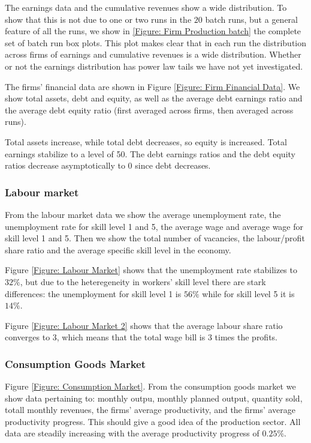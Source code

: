 \documentclass{article}
\begin{document}
The earnings data and the cumulative revenues show a wide distribution. To show that this is not due to one or two runs in the $20$ batch runs, but a general feature of all the runs, we  show in \ref{Figure: Firm Production batch} the complete set of batch run box plots. This plot makes clear that in each run the distribution across firms of earnings and cumulative revenues is a wide distribution.
Whether or not the earnings distribution has power law tails we have not yet investigated.

The firms' financial data are shown in Figure \ref{Figure: Firm Financial Data}. We show total assets, debt and equity, as well as
the average debt earnings ratio and the average debt equity ratio (first averaged across firms, then averaged across runs).

Total assets increase, while total debt decreases, so equity is increased. Total earnings stabilize to a level of 50.
The debt earnings ratios and the debt equity ratios decrease asymptotically to 0 since debt decreases.

\subsubsection*{Labour market}
From the labour market data we show the average unemployment rate, the unemployment rate for skill level 1 and 5, the average wage and 
average wage for skill level 1 and 5. Then we show the total number of vacancies, the labour/profit share ratio and the average specific skill level in the economy.

Figure \ref{Figure: Labour Market} shows that the unemployment rate stabilizes to $32\%$, but due to the heteregeneity in workers' skill level there are stark differences: the unemployment for skill level 1 is $56\%$ while for skill level  5 it is $14\%$.

Figure \ref{Figure: Labour Market 2} shows that the average labour share ratio converges to 3, which means that the total wage bill is 3 times the profits.

\subsubsection*{Consumption Goods Market}
Figure \ref{Figure: Consumption Market}.
From the consumption goods market we show data pertaining to: monthly outpu, monthly planned output, quantity sold, totall monthly revenues,
the firms' average productivity, and the firms' average productivity progress. This should give a good idea of the production sector.
All data are steadily increasing with the average productivity progress of $0.25\%$.
\end{document}
